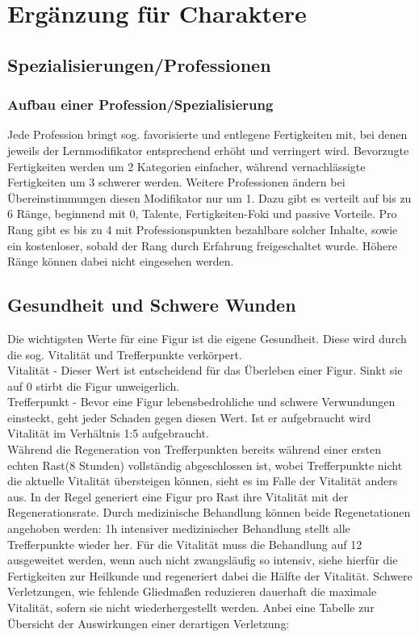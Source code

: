 \documentclass[a4paper,12pt,oneside]{book}
\begin{document}
\part{Ergänzung für Charaktere}
\setcounter{chapter}{0}
\chapter{Spezialisierungen/Professionen}
\section{Aufbau einer Profession/Spezialisierung}
Jede Profession bringt sog. favorisierte und entlegene Fertigkeiten mit, bei denen jeweils der Lernmodifikator entsprechend erhöht und verringert wird. Bevorzugte Fertigkeiten werden um 2 Kategorien einfacher, während vernachlässigte Fertigkeiten um 3 schwerer werden. Weitere Professionen ändern bei Übereinstimmungen diesen Modifikator nur um 1.
Dazu gibt es verteilt auf bis zu 6 Ränge, beginnend mit 0, Talente, Fertigkeiten-Foki und passive Vorteile.
Pro Rang gibt es bis zu 4 mit Professionspunkten bezahlbare solcher Inhalte, sowie ein kostenloser, sobald der Rang durch Erfahrung freigeschaltet wurde. Höhere Ränge können dabei nicht eingesehen werden.  


\chapter{Gesundheit und Schwere Wunden}
Die wichtigsten Werte für eine Figur ist die eigene Gesundheit. Diese wird durch die sog. Vitalität und Trefferpunkte verkörpert.
\\Vitalität - Dieser Wert ist entscheidend für das Überleben einer Figur. Sinkt sie auf 0 stirbt die Figur unweigerlich.
\\Trefferpunkt - Bevor eine Figur lebensbedrohliche und schwere Verwundungen einsteckt, geht jeder Schaden gegen diesen Wert. Ist er aufgebraucht wird Vitalität im Verhältnis 1:5 aufgebraucht.
\\Während die Regeneration von Trefferpunkten bereits während einer ersten echten Rast(8 Stunden) vollständig abgeschlossen ist, wobei Trefferpunkte nicht die aktuelle Vitalität übersteigen können, sieht es im Falle der Vitalität anders aus. In der Regel generiert eine Figur pro Rast ihre Vitalität mit der Regenerationsrate. Durch medizinische Behandlung können beide Regenetationen angehoben werden: 1h intensiver medizinischer Behandlung stellt alle Trefferpunkte wieder her. Für die Vitalität muss die Behandlung auf 12 ausgeweitet werden, wenn auch nicht zwangsläufig so intensiv, siehe hierfür die Fertigkeiten zur Heilkunde und regeneriert dabei die Hälfte der Vitalität.
Schwere Verletzungen, wie fehlende Gliedmaßen reduzieren dauerhaft die maximale Vitalität, sofern sie nicht wiederhergestellt werden. Anbei eine Tabelle zur Übersicht der Auswirkungen einer derartigen Verletzung:
\end{document}

